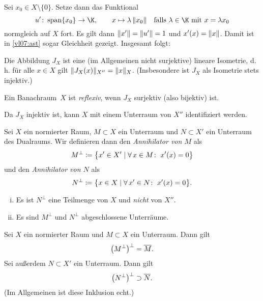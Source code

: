 Sei $x_0\in X\setminus\{0\}$. Setze dann das Funktional
\[ u'\colon \spann\{x_0\} \to \K, \qquad 
    x \mapsto \lambda\,\norm{x_0} 
    \text{\quad falls $\lambda\in\K$ mit $x=\lambda x_0$}
\]
normgleich auf $X$ fort.
Es gilt dann $\lVert x'\rVert = \lVert u'\rVert = 1$ und $x'(x) = \lVert x\rVert$. Damit ist
in \eqref{vl07:ast} sogar Gleichheit gezeigt. Insgesamt folgt:
\begin{thSatz}
    Die Abbildung $J_X$ ist eine (im Allgemeinen nicht surjektive) lineare
    Isometrie, d.\,h. für alle $x\in X$ gilt $\lVert J_X(x)\rVert_{X''} 
    = \lVert x\rVert_X$. (Insbesondere ist $J_X$ als Isometrie stets injektiv.)
\end{thSatz}

\begin{thDef}
    Ein Banachraum~$X$ ist \emph{reflexiv}, wenn $J_X$ surjektiv (also
    bijektiv) ist.
\end{thDef}

\nnBemerkung
Da $J_X$ injektiv ist, kann $X$ mit einem Unterraum von $X''$ identifiziert
werden.

\begin{thDef}
    Sei $X$ ein normierter Raum, $M\subset X$ ein Unterraum und $N\subset X'$
    ein Unterraum des Dualraums.
    Wir definieren dann den \emph{Annihilator von $M$} als
    \[ M^\perp \defeq \bigl\{ x'\in X' \Mid 
        \forall\,x\in M\colon\; x'(x) = 0\bigr\}  \]
    und den \emph{Annihilator von $N$} als
    \[ N^\perp \defeq \bigl\{ x\in X \Mid 
        \forall\,x'\in N\colon\; x'(x) = 0 \bigr\}
    . \]
\end{thDef}

\begin{thBemerkung}\hfill
    \begin{enumerate}[i)]
        \item 
            Es ist $N^\perp$ eine Teilmenge von $X$ und \emph{nicht} 
            von $X''$.
        \item
            Es sind $M^\perp$ und $N^\perp$ abgeschlossene Unterräume.
    \end{enumerate}
\end{thBemerkung}

\begin{thSatz}
    Sei $X$ ein normierter Raum und $M\subset X$ ein Unterraum. Dann gilt
    \[ \bigl(M^\perp\bigr)^\perp = \overline{M}  . \] 
    Sei außerdem $N\subset X'$ ein Unterraum.  Dann gilt 
    \[ \bigl(N^\perp\bigr)^\perp \supset \overline{N}  . \]
    (Im Allgemeinen ist diese Inklusion echt.)
\end{thSatz}

